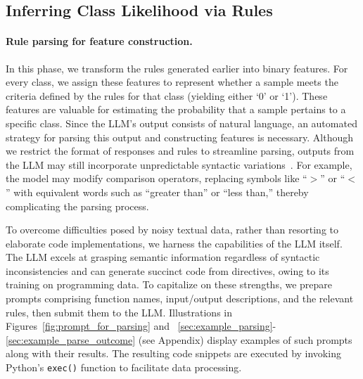 \subsection{Inferring Class Likelihood via Rules}
\label{Sec:training}

\paragraph{Rule parsing for feature construction.} In this phase, we transform the rules generated earlier into binary features. For every class, we assign these features to represent whether a sample meets the criteria defined by the rules for that class (yielding either ‘0’ or ‘1’). These features are valuable for estimating the probability that a sample pertains to a specific class. Since the LLM’s output consists of natural language, an automated strategy for parsing this output and constructing features is necessary. Although we restrict the format of responses and rules to streamline parsing, outputs from the LLM may still incorporate unpredictable syntactic variations~\cite{kovavc2023large}. For example, the model may modify comparison operators, replacing symbols like “$>$” or “$<$” with equivalent words such as “greater than” or “less than,” thereby complicating the parsing process.

To overcome difficulties posed by noisy textual data, rather than resorting to elaborate code implementations, we harness the capabilities of the LLM itself. The LLM excels at grasping semantic information regardless of syntactic inconsistencies and can generate succinct code from directives, owing to its training on programming data. To capitalize on these strengths, we prepare prompts comprising function names, input/output descriptions, and the relevant rules, then submit them to the LLM. Illustrations in Figures~\ref{fig:prompt_for_parsing} and ~\ref{sec:example_parsing}-\ref{sec:example_parse_outcome} (see Appendix) display examples of such prompts along with their results. The resulting code snippets are executed by invoking Python’s \texttt{exec()} function to facilitate data processing.

\vspace*{-0.12in}
